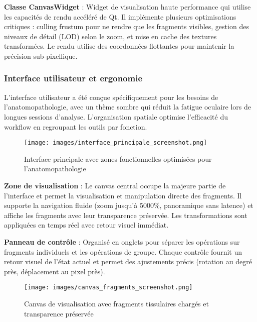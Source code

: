 \textbf{Classe CanvasWidget} : Widget de visualisation haute performance qui utilise les capacités de rendu accéléré de Qt. Il implémente plusieurs optimisations critiques : culling frustum pour ne rendre que les fragments visibles, gestion des niveaux de détail (LOD) selon le zoom, et mise en cache des textures transformées. Le rendu utilise des coordonnées flottantes pour maintenir la précision sub-pixellique.

\subsubsection{Interface utilisateur et ergonomie}

L'interface utilisateur a été conçue spécifiquement pour les besoins de l'anatomopathologie, avec un thème sombre qui réduit la fatigue oculaire lors de longues sessions d'analyse. L'organisation spatiale optimise l'efficacité du workflow en regroupant les outils par fonction.

\begin{figure}[H]
\centering
\texttt{[image: images/interface\_principale\_screenshot.png]}
\caption{Interface principale avec zones fonctionnelles optimisées pour l'anatomopathologie}
\label{fig:interface_principale}
\end{figure}

\textbf{Zone de visualisation} : Le canvas central occupe la majeure partie de l'interface et permet la visualisation et manipulation directe des fragments. Il supporte la navigation fluide (zoom jusqu'à 5000\%, panoramique sans latence) et affiche les fragments avec leur transparence préservée. Les transformations sont appliquées en temps réel avec retour visuel immédiat.

\textbf{Panneau de contrôle} : Organisé en onglets pour séparer les opérations sur fragments individuels et les opérations de groupe. Chaque contrôle fournit un retour visuel de l'état actuel et permet des ajustements précis (rotation au degré près, déplacement au pixel près).

\begin{figure}[H]
\centering
\texttt{[image: images/canvas\_fragments\_screenshot.png]}
\caption{Canvas de visualisation avec fragments tissulaires chargés et transparence préservée}
\label{fig:canvas_fragments}
\end{figure}

